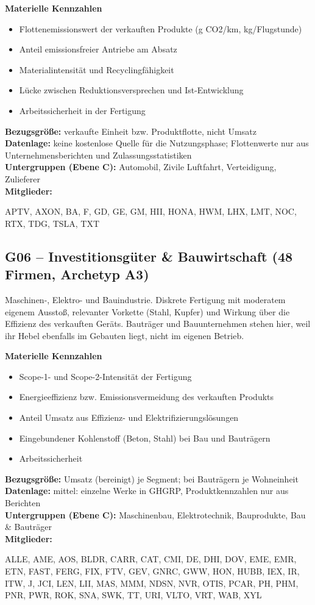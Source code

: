 \noindent\textbf{Materielle Kennzahlen}
\begin{itemize}[nosep,leftmargin=1.2em]
  \item Flottenemissionswert der verkauften Produkte (g CO2/km, kg/Flugstunde)
  \item Anteil emissionsfreier Antriebe am Absatz
  \item Materialintensität und Recyclingfähigkeit
  \item Lücke zwischen Reduktionsversprechen und Ist-Entwicklung
  \item Arbeitssicherheit in der Fertigung
\end{itemize}
\noindent\textbf{Bezugsgröße:} verkaufte Einheit bzw. Produktflotte, nicht Umsatz\\
\textbf{Datenlage:} keine kostenlose Quelle für die Nutzungsphase; Flottenwerte nur aus Unternehmensberichten und Zulassungsstatistiken\\
\textbf{Untergruppen (Ebene C):} Automobil, Zivile Luftfahrt, Verteidigung, Zulieferer\\
\textbf{Mitglieder:} {\raggedright\small\ttfamily APTV, AXON, BA, F, GD, GE, GM, HII, HONA, HWM, LHX, LMT, NOC, RTX, TDG, TSLA, TXT\par}

\medskip
\subsection*{G06 -- Investitionsgüter \& Bauwirtschaft \normalfont\small (48 Firmen, Archetyp A3)}
\noindent Maschinen-, Elektro- und Bauindustrie. Diskrete Fertigung mit moderatem eigenem Ausstoß, relevanter Vorkette (Stahl, Kupfer) und Wirkung über die Effizienz des verkauften Geräts. Bauträger und Bauunternehmen stehen hier, weil ihr Hebel ebenfalls im Gebauten liegt, nicht im eigenen Betrieb.

\noindent\textbf{Materielle Kennzahlen}
\begin{itemize}[nosep,leftmargin=1.2em]
  \item Scope-1- und Scope-2-Intensität der Fertigung
  \item Energieeffizienz bzw. Emissionsvermeidung des verkauften Produkts
  \item Anteil Umsatz aus Effizienz- und Elektrifizierungslösungen
  \item Eingebundener Kohlenstoff (Beton, Stahl) bei Bau und Bauträgern
  \item Arbeitssicherheit
\end{itemize}
\noindent\textbf{Bezugsgröße:} Umsatz (bereinigt) je Segment; bei Bauträgern je Wohneinheit\\
\textbf{Datenlage:} mittel: einzelne Werke in GHGRP, Produktkennzahlen nur aus Berichten\\
\textbf{Untergruppen (Ebene C):} Maschinenbau, Elektrotechnik, Bauprodukte, Bau \& Bauträger\\
\textbf{Mitglieder:} {\raggedright\small\ttfamily ALLE, AME, AOS, BLDR, CARR, CAT, CMI, DE, DHI, DOV, EME, EMR, ETN, FAST, FERG, FIX, FTV, GEV, GNRC, GWW, HON, HUBB, IEX, IR, ITW, J, JCI, LEN, LII, MAS, MMM, NDSN, NVR, OTIS, PCAR, PH, PHM, PNR, PWR, ROK, SNA, SWK, TT, URI, VLTO, VRT, WAB, XYL\par}

